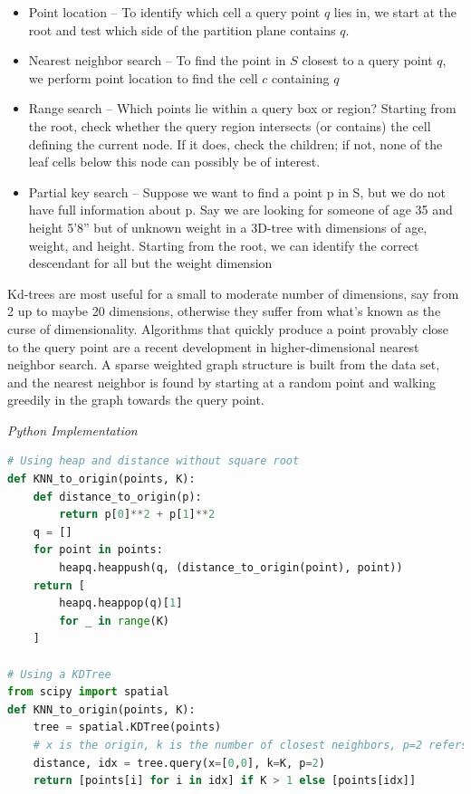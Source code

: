 \documentclass{article}
\begin{document}
    \begin{itemize}
        \item Point location – To identify which cell a query point $q$ lies in, we start at the root and test which side of the partition plane contains $q$.
        
        \item Nearest neighbor search – To find the point in $S$ closest to a query point $q$, we perform point location to find the cell $c$ containing $q$
        
        \item Range search – Which points lie within a query box or region? Starting from the root, check whether the query region intersects (or contains) the cell defining the current node. If it does, check the children; if not, none of the leaf cells below this node can possibly be of interest.
        
        \item Partial key search – Suppose we want to find a point p in S, but we do not have full information about p. Say we are looking for someone of age 35 and height 5’8” but of unknown weight in a 3D-tree with dimensions of age, weight, and height. Starting from the root, we can identify the correct descendant for all but the weight dimension
    \end{itemize}
    
    Kd-trees are most useful for a small to moderate number of dimensions, say from 2 up to maybe 20 dimensions, otherwise they suffer from what's known as the curse of dimensionality. Algorithms that quickly produce a point provably close to the query point are a recent development in higher-dimensional nearest neighbor search. A sparse weighted graph structure is built from the data set, and the nearest neighbor is found by starting at a random point and walking greedily in the graph towards the query point.
    
\vspace{8pt} \emph{Python Implementation}
\begin{lstlisting}[language=Python]
# Using heap and distance without square root
def KNN_to_origin(points, K):
    def distance_to_origin(p):
        return p[0]**2 + p[1]**2
    q = []
    for point in points:
        heapq.heappush(q, (distance_to_origin(point), point))
    return [
        heapq.heappop(q)[1]
        for _ in range(K)
    ]

# Using a KDTree
from scipy import spatial
def KNN_to_origin(points, K):
    tree = spatial.KDTree(points)
	# x is the origin, k is the number of closest neighbors, p=2 refers to choosing l2 norm (euclidean distance)
    distance, idx = tree.query(x=[0,0], k=K, p=2) 
    return [points[i] for i in idx] if K > 1 else [points[idx]]
\end{lstlisting}
\end{document}
